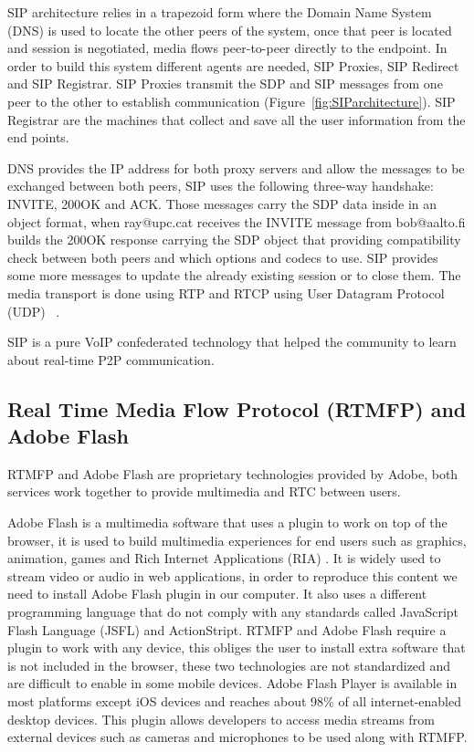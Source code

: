 SIP architecture relies in a trapezoid form where the Domain Name System (DNS)  is used to locate the other peers of the system, once that peer is located and session is negotiated, media flows peer-to-peer directly to the endpoint. In order to build this system different agents are needed, SIP Proxies, SIP Redirect and SIP Registrar. SIP Proxies transmit the SDP and SIP messages from one peer to the other to establish communication (Figure~\ref{fig:SIParchitecture}). SIP Registrar are the machines that collect and save all the user information from the end points.

DNS provides the IP address for both proxy servers and allow the messages to be exchanged between both peers, SIP uses the following three-way handshake: INVITE, 200OK and ACK. Those messages carry the SDP data inside in an object format, when ray@upc.cat receives the INVITE message from bob@aalto.fi builds the 200OK response carrying the SDP object that providing compatibility check between both peers and which options and codecs to use. SIP provides some more messages to update the already existing session or to close them. The media transport is done using RTP and RTCP using User Datagram Protocol (UDP) ~\cite{sipRFC}.

SIP is a pure VoIP confederated technology that helped the community to learn about real-time P2P communication.

\subsection{Real Time Media Flow Protocol (RTMFP)  and Adobe Flash}

RTMFP and Adobe Flash are proprietary technologies provided by Adobe, both services work together to provide multimedia and RTC between users.

Adobe Flash is a multimedia software that uses a plugin to work on top of the browser, it is used to build multimedia experiences for end users such as graphics, animation, games and Rich Internet Applications (RIA) . It is widely used to stream video or audio in web applications, in order to reproduce this content we need to install Adobe Flash plugin in our computer. It also uses a different programming language that do not comply with any standards called JavaScript Flash Language (JSFL)  and ActionStript. RTMFP and Adobe Flash require a plugin to work with any device, this obliges the user to install extra software that is not included in the browser, these two technologies are not standardized and are difficult to enable in some mobile devices. Adobe Flash Player is available in most platforms except iOS devices and reaches about 98\% of all internet-enabled desktop devices. This plugin allows developers to access media streams from external devices such as cameras and microphones to be used along with RTMFP.

